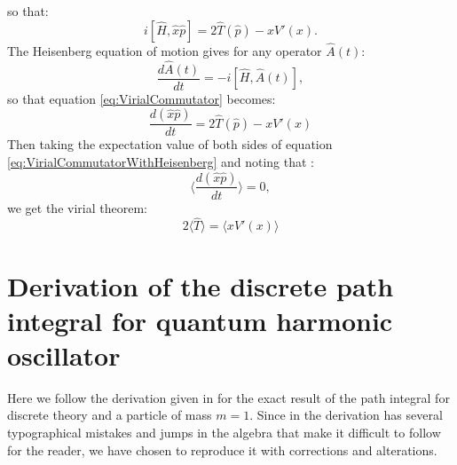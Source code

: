 \documentclass[12pt]{article}
\begin{document}
        so that:
        \begin{equation}
            \label{eq:VirialCommutator}
            i\left[\hat{H},\hat{x}\hat{p}\right] = 2\hat{T}\left(\hat{p}\right)-xV'\left(x\right).
        \end{equation}
        The Heisenberg equation of motion gives for any operator $\hat{A}\left(t\right)$:
        \begin{equation}
            \label{eq:HeisenbergEquationOfMotion}
            \frac{d\hat{A}\left(t\right)}{dt} = -i\left[\hat{H},\hat{A}\left(t\right)\right],
        \end{equation}
        so that equation \ref{eq:VirialCommutator} becomes:
        \begin{equation}
            \label{eq:VirialCommutatorWithHeisenberg}
            \frac{d\left(\hat{x}\hat{p}\right)}{dt} = 2\hat{T}\left(\hat{p}\right)-xV'\left(x\right)
        \end{equation}
        Then taking the expectation value of both sides of equation \ref{eq:VirialCommutatorWithHeisenberg} and noting that :
        \begin{equation}
            \label{eq:VanishingExpectationOfTimeDerivative}
            \langle \frac{d\left(\hat{x}\hat{p}\right)}{dt} \rangle = 0,
        \end{equation}
        we get the virial theorem:
        \begin{equation}
            \label{eq:VirialTheoremAppendix}
            2\langle\hat{T}\rangle = \langle xV'\left(x\right)\rangle
        \end{equation}




    \section{Derivation of the discrete path integral for quantum harmonic oscillator}
        \label{ap:DiscretePathIntegralDerivation}
        Here we follow the derivation given in \cite{creutz_freedman_1981} for the exact result of the path integral for discrete theory and a particle of mass $m=1$. Since in \cite{creutz_freedman_1981} the derivation has several typographical mistakes and jumps in the algebra that make it difficult to follow for the reader, we have chosen to reproduce it with corrections and alterations.
\end{document}
